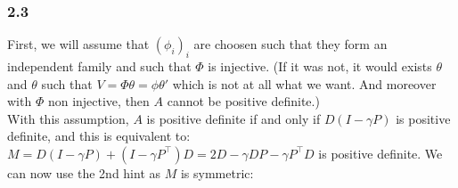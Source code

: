 \documentclass[a4paper]{article}
\newcommand{\transp}{\intercal}
\begin{document}
\subsubsection*{2.3}

First, we will assume that $(\phi_i)_i$ are choosen such that they form an independent family and such that $\Phi$ is injective. (If it was not,
it would exists $\theta$ and $\theta$ such that $V = \Phi\theta = \phi\theta'$ which is not at all what we want. And moreover with $\Phi$ non injective, then
$A$ cannot be positive definite.)\\
With this assumption, $A$ is positive definite if and only if $D(I - \gamma P)$ is positive definite, and this is equivalent to:
$M = D (I - \gamma P) + (I - \gamma P^\transp)D = 2D - \gamma DP - \gamma P^\transp D$ is positive definite. We can now use the 2nd hint as $M$ is symmetric:
\end{document}
